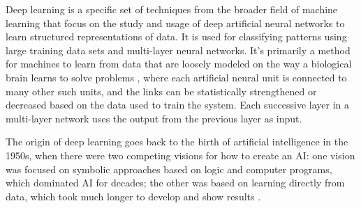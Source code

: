 Deep learning \cite{Polson2018} is a specific set of techniques from the broader field of machine learning that focus on the study and usage of deep artificial neural networks to learn structured representations of data. It is used for classifying patterns using large training data sets and multi-layer neural networks. It's primarily a method for machines to learn from data that are loosely modeled on the way a biological brain learns to solve problems \cite{pavlus_john}, where each artificial neural unit is connected to many other such units, and the links can be statistically strengthened or decreased based on the data used to train the system. Each successive layer in a multi-layer network uses the output from the previous layer as input.

The origin of deep learning goes back to the birth of artificial intelligence in the 1950s, when there were two competing visions for how to create an AI: one vision was focused on symbolic approaches based on logic and computer programs, which dominated AI for decades; the other was based on learning directly from data, which took much longer to develop and show results \cite{sejnowski2018deep}.

